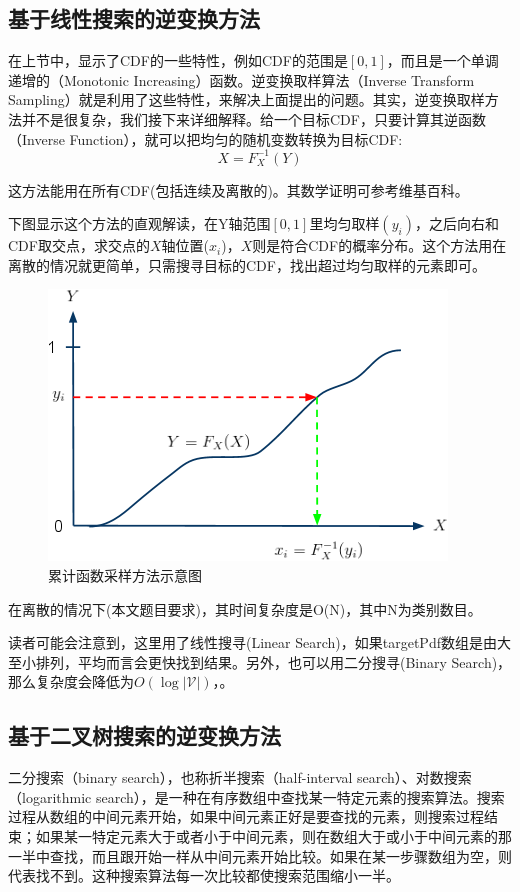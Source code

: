 \subsection{基于线性搜索的逆变换方法}
在上节中，显示了CDF的一些特性，例如CDF的范围是$[0,1]$，而且是一个单调递增的（Monotonic Increasing）函数。逆变换取样算法（Inverse Transform Sampling）就是利用了这些特性，来解决上面提出的问题。其实，逆变换取样方法并不是很复杂，我们接下来详细解释。给一个目标CDF，只要计算其逆函数（Inverse Function），就可以把均匀的随机变数转换为目标CDF:
\begin{equation}\label{equ:func}
  X=F_X^{-1}(Y)
\end{equation}

这方法能用在所有CDF(包括连续及离散的)。其数学证明可参考维基百科。

下图显示这个方法的直观解读，在Y轴范围$[0,1]$里均匀取样$(y_i)$，之后向右和CDF取交点，求交点的$X$轴位置($x_i$)，$X$则是符合CDF的概率分布。这个方法用在离散的情况就更简单，只需搜寻目标的CDF，找出超过均匀取样的元素即可。
\begin{figure}[!h]
  \centering
\includegraphics[width=0.5\linewidth]{./figures/cdf.png}
\caption{累计函数采样方法示意图}\label{fig:cdf}
\end{figure}
在离散的情况下(本文题目要求)，其时间复杂度是O(N)，其中N为类别数目。

读者可能会注意到，这里用了线性搜寻(Linear Search)，如果targetPdf数组是由大至小排列，平均而言会更快找到结果。另外，也可以用二分搜寻(Binary Search)，那么复杂度会降低为$O(\log |\mathcal{V}|)$，。


\subsection{基于二叉树搜索的逆变换方法}
二分搜索（binary search），也称折半搜索（half-interval search）、对数搜索（logarithmic search），是一种在有序数组中查找某一特定元素的搜索算法。搜索过程从数组的中间元素开始，如果中间元素正好是要查找的元素，则搜索过程结束；如果某一特定元素大于或者小于中间元素，则在数组大于或小于中间元素的那一半中查找，而且跟开始一样从中间元素开始比较。如果在某一步骤数组为空，则代表找不到。这种搜索算法每一次比较都使搜索范围缩小一半。

